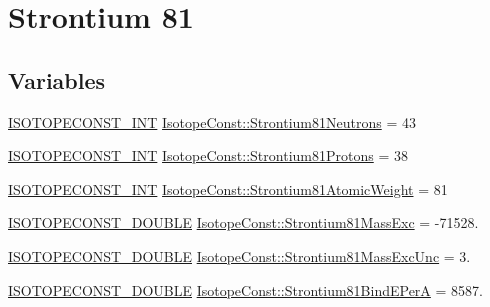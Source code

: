 \hypertarget{group___isotope_const-_strontium-_sr81}{}\section{Strontium 81}
\label{group___isotope_const-_strontium-_sr81}
\subsection*{Variables}
\begin{DoxyCompactItemize}
\item 
\mbox{\hyperlink{group___isotope_const-_macros_ga5f18360b3e99483a35c32d789e62621c}{I\+S\+O\+T\+O\+P\+E\+C\+O\+N\+S\+T\+\_\+\+I\+NT}} \mbox{\hyperlink{group___isotope_const-_strontium-_sr81_gaf9c48d3c193ea4bbdc4b717c98544117}{Isotope\+Const\+::\+Strontium81\+Neutrons}} = 43
\item 
\mbox{\hyperlink{group___isotope_const-_macros_ga5f18360b3e99483a35c32d789e62621c}{I\+S\+O\+T\+O\+P\+E\+C\+O\+N\+S\+T\+\_\+\+I\+NT}} \mbox{\hyperlink{group___isotope_const-_strontium-_sr81_gabb94db416de6ba04602f7b2fd986541c}{Isotope\+Const\+::\+Strontium81\+Protons}} = 38
\item 
\mbox{\hyperlink{group___isotope_const-_macros_ga5f18360b3e99483a35c32d789e62621c}{I\+S\+O\+T\+O\+P\+E\+C\+O\+N\+S\+T\+\_\+\+I\+NT}} \mbox{\hyperlink{group___isotope_const-_strontium-_sr81_ga299cb670586ca03c7101435f5d2008b0}{Isotope\+Const\+::\+Strontium81\+Atomic\+Weight}} = 81
\item 
\mbox{\hyperlink{group___isotope_const-_macros_ga8f45a7272ce02c0b4c65c44636ed719a}{I\+S\+O\+T\+O\+P\+E\+C\+O\+N\+S\+T\+\_\+\+D\+O\+U\+B\+LE}} \mbox{\hyperlink{group___isotope_const-_strontium-_sr81_gafc3232b66f927387e0c5ea9141ff29e7}{Isotope\+Const\+::\+Strontium81\+Mass\+Exc}} = -\/71528.
\item 
\mbox{\hyperlink{group___isotope_const-_macros_ga8f45a7272ce02c0b4c65c44636ed719a}{I\+S\+O\+T\+O\+P\+E\+C\+O\+N\+S\+T\+\_\+\+D\+O\+U\+B\+LE}} \mbox{\hyperlink{group___isotope_const-_strontium-_sr81_ga629a02fffe6b37d61f01d20bea6eeaf2}{Isotope\+Const\+::\+Strontium81\+Mass\+Exc\+Unc}} = 3.
\item 
\mbox{\hyperlink{group___isotope_const-_macros_ga8f45a7272ce02c0b4c65c44636ed719a}{I\+S\+O\+T\+O\+P\+E\+C\+O\+N\+S\+T\+\_\+\+D\+O\+U\+B\+LE}} \mbox{\hyperlink{group___isotope_const-_strontium-_sr81_ga08fb740cba090e88318cadc3930fb3a7}{Isotope\+Const\+::\+Strontium81\+Bind\+E\+PerA}} = 8587.
\item 

\end{DoxyCompactItemize}
